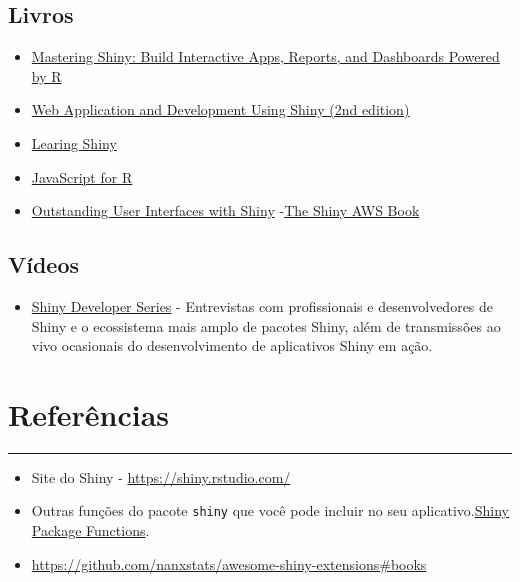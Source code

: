 \documentclass[
]{book}
\providecommand{\tightlist}{%
  \setlength{\itemsep}{0pt}\setlength{\parskip}{0pt}}
\begin{document}
\hypertarget{livros}{%
\section{\texorpdfstring{\textbf{Livros}}{Livros}}\label{livros}}

\begin{itemize}
\tightlist
\item
  \href{https://mastering-shiny.org/index.html}{Mastering Shiny: Build Interactive Apps, Reports, and Dashboards Powered by R}
\item
  \href{https://www.amazon.com/Web-Application-Development-using-Shiny/dp/1782174346}{Web Application and Development Using Shiny (2nd edition)}
\item
  \href{https://www.amazon.com/Learning-Shiny-Hernan-G-Resnizky/dp/1785280902}{Learing Shiny}
\item
  \href{https://book.javascript-for-r.com/}{JavaScript for R}
\item
  \href{https://unleash-shiny.rinterface.com/}{Outstanding User Interfaces with Shiny}
  -\href{https://business-science.github.io/shiny-production-with-aws-book/index.html}{The Shiny AWS Book}
\end{itemize}

\hypertarget{vuxeddeos}{%
\section{\texorpdfstring{\textbf{Vídeos}}{Vídeos}}\label{vuxeddeos}}

\begin{itemize}
\tightlist
\item
  \href{https://shinydevseries.com/}{Shiny Developer Series} - Entrevistas com profissionais e desenvolvedores de Shiny e o ecossistema mais amplo de pacotes Shiny, além de transmissões ao vivo ocasionais do desenvolvimento de aplicativos Shiny em ação.
\end{itemize}

\hypertarget{referuxeancias}{%
\chapter{\texorpdfstring{\textbf{Referências}}{Referências}}\label{referuxeancias}}

\begin{center}\rule{0.5\linewidth}{0.5pt}\end{center}

\begin{itemize}
\item
  Site do Shiny - \url{https://shiny.rstudio.com/}
\item
  Outras funções do pacote \texttt{shiny} que você pode incluir no seu aplicativo.\href{https://shiny.rstudio.com/reference/shiny/1.0.5/}{Shiny Package Functions}.
\item
  \url{https://github.com/nanxstats/awesome-shiny-extensions\#books}
\end{itemize}

  
\end{document}
